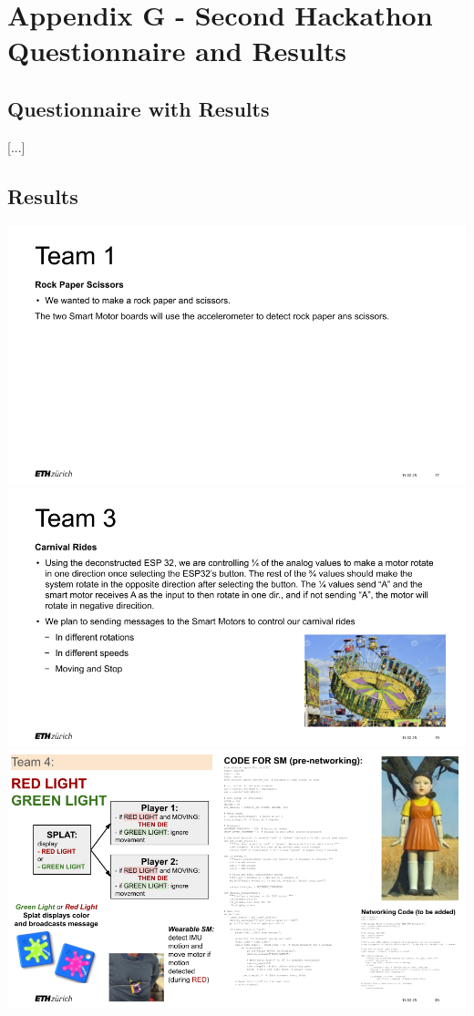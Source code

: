 \cleardoublepage%
\chapter*{\label{chap:apx_f}Appendix G - Second Hackathon Questionnaire and Results}%
%


\section*{Questionnaire with Results}
[...]

\section*{Results}

\includegraphics[width=\linewidth]{overleaf/images/Hackathon21.png}
\includegraphics[width=\linewidth]{overleaf/images/Hackathon23.png}
\includegraphics[width=\linewidth]{overleaf/images/Hackathon24.png}